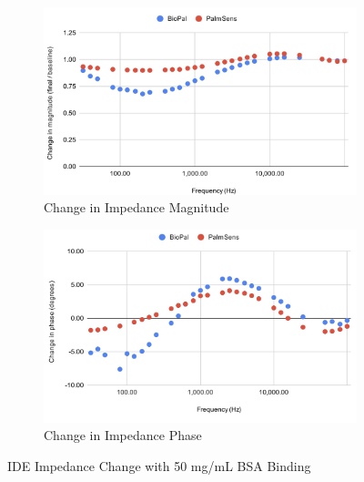 \begin{figure}[H]
    \centering
    \begin{subfigure}{0.48\textwidth}   
        \includegraphics[width=\textwidth]{5g:100mL mag.png}
        \caption{Change in Impedance Magnitude}
        \label{fig:5g_mag}
    \end{subfigure}
    \hfill
    \begin{subfigure}{0.48\textwidth}
        \includegraphics[width=\textwidth]{5g:100mL phase.png}
        \caption{Change in Impedance Phase}
        \label{fig:5g_phase}
    \end{subfigure}
    \caption{IDE Impedance Change with 50 mg/mL BSA Binding}
    \label{fig:5g_bsa_comparison}
\end{figure}

